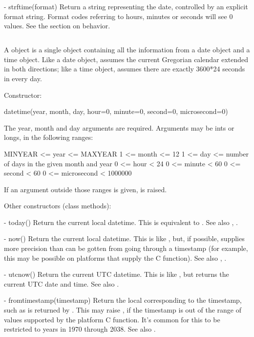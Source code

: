   - strftime(format)
    Return a string representing the date, controlled by an explicit
    format string.  Format codes referring to hours, minutes or seconds
    will see 0 values.
    See the section on  behavior.


\subsection{ \label{datetime-datetime}}

A  object is a single object containing all the
information from a date object and a time object.  Like a date object,
 assumes the current Gregorian calendar extended in
both directions; like a time object,  assumes there
are exactly 3600*24 seconds in every day.

Constructor:

    datetime(year, month, day,
             hour=0, minute=0, second=0, microsecond=0)

    The year, month and day arguments are required.  Arguments may be ints
    or longs, in the following ranges:

        MINYEAR <= year <= MAXYEAR
        1 <= month <= 12
        1 <= day <= number of days in the given month and year
        0 <= hour < 24
        0 <= minute < 60
        0 <= second < 60
        0 <= microsecond < 1000000

    If an argument outside those ranges is given,
     is raised.

Other constructors (class methods):

  - today()
    Return the current local datetime.  This is equivalent to
    .
    See also , .

  - now()
    Return the current local datetime.  This is like ,
    but, if possible, supplies more precision than can be gotten from
    going through a  timestamp (for example,
    this may be possible on platforms that supply the C
     function).
    See also , .

  - utcnow()
    Return the current UTC datetime.  This is like , but
    returns the current UTC date and time.
    See also .

  - fromtimestamp(timestamp)
    Return the local  corresponding to the \POSIX{}
    timestamp, such as is returned by .  This
    may raise , if the timestamp is out of the
    range of values supported by the platform C
     function.  It's common for this to be
    restricted to years in 1970 through 2038.
    See also .

